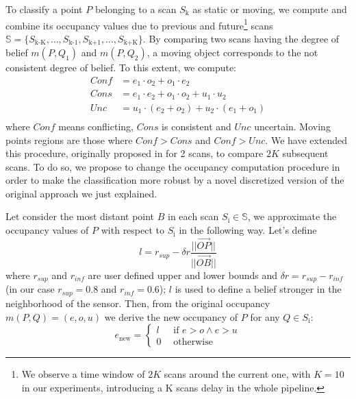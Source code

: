 To classify a point $P$ belonging to a scan $S_{\text{k}}$ as static or moving, we compute and combine its occupancy values due to previous and future\footnote{We observe a time window of $2K$ scans around the current one, with $K=10$ in our experiments, introducing a K scans delay in the whole pipeline.} scans $\mathbb{S} = \{S_{\text{k-K}}, \dots, S_{\text{k-1}}, S_{\text{k+1}}, \dots, S_{\text{k+K}} \}$.
By comparing two scans having the degree of belief $m(P,Q_1)$ and $m(P,Q_2)$, a moving object corresponds to the not consistent degree of belief. To this extent, we compute:
\begin{equation}
 \begin{split}
  Conf &= e_1\cdot o_2 + o_1\cdot e_2\ \\
  Cons &= e_1\cdot e_2 + o_1\cdot o_2 + u_1\cdot u_2\ \\
  Unc\ &= u_1\cdot (e_2 + o_2) + u_2\cdot (e_1 + o_1)\\
 \end{split}
\end{equation}
where $Conf$ means conflicting, $Cons$ is consistent and $Unc$ uncertain. 
Moving points regions are those where $Conf > Cons$ and $Conf > Unc$. 
We have extended this procedure, originally proposed in \cite{xiao2013change} for 2 scans, to compare $2K$ subsequent scans.
To do so, we propose to change the occupancy computation procedure in order to make the classification more robust by a novel discretized version of the original approach we just explained. 

Let consider the most distant point $B$ in each scan $S_{\text{i}} \in \mathbb{S}$, we approximate the occupancy values of $P$ with respect to $S_{\text{i}}$ in the following way. Let's define 
\[
 l = r_{sup} - \delta r\frac{||\overrightarrow{OP}||}{||\overrightarrow{OB}||}
\] 
where $r_{sup}$ and $r_{inf}$ are user defined upper and lower bounds and $\delta r = r_{sup} - r_{inf}$ (in our case  $r_{sup} = 0.8$ and $r_{inf} = 0.6$); $l$ is used to define a belief stronger in the neighborhood of the sensor. Then, from the original occupancy $m(P,Q)=(e, o, u)$ we derive the new occupancy of $P$ for any $Q\in S_{\text{i}}$:
\begin{equation}
 e_{\text{new}} = \begin{cases}
      l\ \ \ &\mbox{if }e > o \wedge e > u \\
      0 &\mbox{otherwise}
     \end{cases}
\end{equation}

